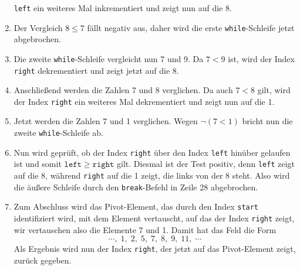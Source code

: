 \begin{enumerate}
      \texttt{left} ein weiteres Mal inkrementiert und zeigt nun auf die 8.
\item Der Vergleich $8 \leq 7$ f\"allt negativ aus, daher wird die erste
      \texttt{while}-Schleife jetzt abgebrochen.
\item Die zweite \texttt{while}-Schleife vergleicht nun 7 und 9.  Da $7 < 9$ ist,
      wird der Index \texttt{right} dekrementiert und zeigt jetzt auf die 8.
\item Anschlie\ss{}end werden die Zahlen 7 und 8 verglichen.  Da auch $7 < 8$ gilt, wird der
      Index \texttt{right} ein weiteres Mal dekrementiert und zeigt nun auf die 1.
\item Jetzt werden die Zahlen 7 und 1 verglichen.  Wegen $\neg (7 < 1)$ bricht nun die
      zweite \texttt{while}-Schleife ab.
\item Nun wird gepr\"uft, ob der Index \texttt{right} \"uber den Index
      \texttt{left} hin\"uber gelaufen ist und somit $\mathtt{left} \geq \mathtt{right}$
      gilt.  Diesmal ist der Test positiv, denn \texttt{left} zeigt auf die 8,
      w\"ahrend \texttt{right} auf die 1 zeigt, die links von der 8 steht.
      Also wird die \"au\ss{}ere Schleife durch den \texttt{break}-Befehl in Zeile 28
      abgebrochen.
\item Zum Abschluss wird das Pivot-Element, das durch den Index \texttt{start}
      identifiziert wird, mit dem Element vertauscht, auf das der Index \texttt{right}
      zeigt,  wir vertauschen also die Elemente 7 und 1.  Damit hat das Feld die Form
      \[ \cdots,\; 1,\; 2,\; 5,\; 7,\; 8,\; 9,\; 11,\;\cdots \]
      Als Ergebnis wird nun der Index \texttt{right}, der jetzt auf das Pivot-Element
      zeigt, zur\"uck gegeben.
\end{enumerate}
 
